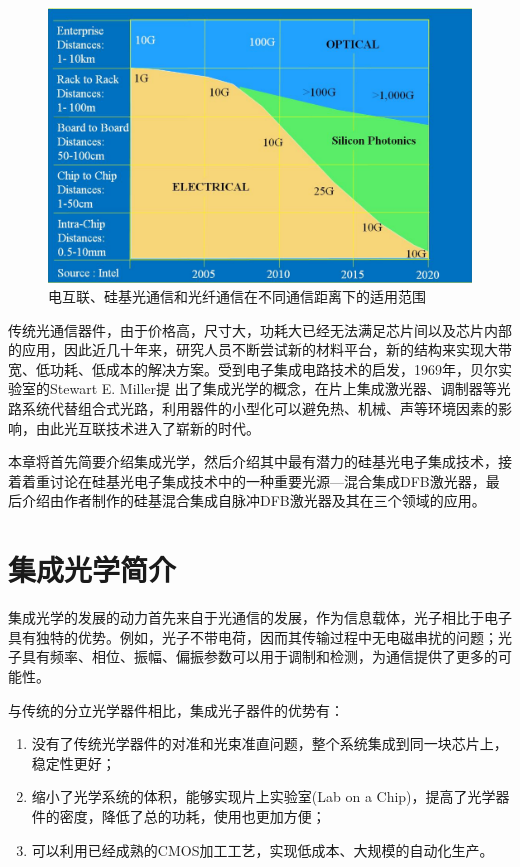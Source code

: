 \begin{figure}[htb]
	\centering
	\includegraphics[width=13cm]{./Pictures/intro_siliconphotonics.png}
	\captionsetup{justification=centering}
	\caption{电互联、硅基光通信和光纤通信在不同通信距离下的适用范围\cite{zuffada2012industrialization}}
	\label{intro_siliconphotonics}
\end{figure}

传统光通信器件，由于价格高，尺寸大，功耗大已经无法满足芯片间以及芯片内部的应用，因此近几十年来，研究人员不断尝试新的材料平台，新的结构来实现大带宽、低功耗、低成本的解决方案。受到电子集成电路技术的启发，1969年，贝尔实验室的Stewart E. Miller提
出了集成光学的概念\cite{miller1969integrated}，在片上集成激光器、调制器等光路系统代替组合式光路，利用器件的小型化可以避免热、机械、声等环境因素的影响，由此光互联技术进入了崭新的时代。

本章将首先简要介绍集成光学，然后介绍其中最有潜力的硅基光电子集成技术，接着着重讨论在硅基光电子集成技术中的一种重要光源---混合集成DFB激光器，最后介绍由作者制作的硅基混合集成自脉冲DFB激光器及其在三个领域的应用。


\section{集成光学简介}

集成光学的发展的动力首先来自于光通信的发展，作为信息载体，光子相比于电子具有独特的优势。例如，光子不带电荷，因而其传输过程中无电磁串扰的问题；光子具有频率、相位、振幅、偏振参数可以用于调制和检测，为通信提供了更多的可能性。

与传统的分立光学器件相比，集成光子器件的优势有：
\begin{enumerate}[(1)]
	\item 
	没有了传统光学器件的对准和光束准直问题，整个系统集成到同一块芯片上，稳定性更好；
	\item
	缩小了光学系统的体积，能够实现片上实验室(Lab on a Chip)，提高了光学器件的密度，降低了总的功耗，使用也更加方便；
	\item 
	可以利用已经成熟的CMOS加工工艺，实现低成本、大规模的自动化生产。
\end{enumerate}

